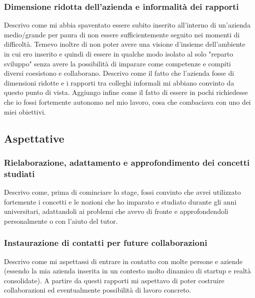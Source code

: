 			\subsubsection{Dimensione ridotta dell'azienda e informalità dei rapporti}
				Descrivo come mi abbia spaventato essere subito inserito all'interno di un'azienda medio/grande per paura di non
				essere sufficientemente seguito nei momenti di difficoltà. Temevo inoltre di non poter avere una visione d'insieme
				dell'ambiente in cui ero inserito e quindi di essere in qualche modo isolato al solo "reparto sviluppo" senza avere
				la possibilità di imparare come competenze e compiti diversi coesistono e collaborano. Descrivo come il fatto che
				l'azienda fosse di dimensioni ridotte e i rapporti tra colleghi informali mi abbiano convinto da questo punto di
				vista. Aggiungo infine come il fatto di essere in pochi richiedesse che io fossi fortemente autonomo nel mio lavoro,
				cosa che combaciava con uno dei miei obiettivi.
		\subsection{Aspettative}
			\subsubsection{Rielaborazione, adattamento e approfondimento dei concetti studiati}
				Descrivo come, prima di cominciare lo stage, fossi convinto che avrei utilizzato fortemente i concetti e le nozioni
				che ho imparato e studiato durante gli anni universitari, adattandoli ai problemi che avevo di fronte e
				approfondendoli personalmente o con l'aiuto del tutor.
			\subsubsection{Instaurazione di contatti per future collaborazioni}
				Descrivo come mi aspettassi di entrare in contatto con molte persone e aziende (essendo la mia azienda inserita in
				un contesto molto dinamico di startup e realtà consolidate). A partire da questi rapporti mi aspettavo di poter
				costruire collaborazioni ed eventualmente possibilità di lavoro concreto.
